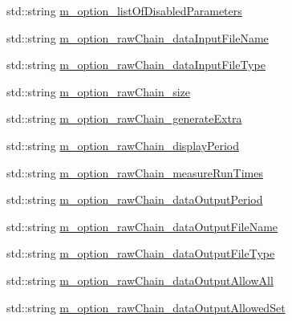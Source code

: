 \begin{DoxyCompactItemize}
\item 
std\-::string \hyperlink{class_q_u_e_s_o_1_1_metropolis_hastings_s_g_options_ae3b9e124f89c653b2b2b09d97baa87ba}{m\-\_\-option\-\_\-list\-Of\-Disabled\-Parameters}
\item 
std\-::string \hyperlink{class_q_u_e_s_o_1_1_metropolis_hastings_s_g_options_a5527cd4da92ce0da6488df811ae5a0b0}{m\-\_\-option\-\_\-raw\-Chain\-\_\-data\-Input\-File\-Name}
\item 
std\-::string \hyperlink{class_q_u_e_s_o_1_1_metropolis_hastings_s_g_options_a1e84e51f68d6be34fa1975950136a6b5}{m\-\_\-option\-\_\-raw\-Chain\-\_\-data\-Input\-File\-Type}
\item 
std\-::string \hyperlink{class_q_u_e_s_o_1_1_metropolis_hastings_s_g_options_af9f6ac21012af90a790e855ad78485e2}{m\-\_\-option\-\_\-raw\-Chain\-\_\-size}
\item 
std\-::string \hyperlink{class_q_u_e_s_o_1_1_metropolis_hastings_s_g_options_a9f4213c0fc6f0cf26eb103c78defc0ae}{m\-\_\-option\-\_\-raw\-Chain\-\_\-generate\-Extra}
\item 
std\-::string \hyperlink{class_q_u_e_s_o_1_1_metropolis_hastings_s_g_options_aa898db5d9a9541c71b727817f1fb443f}{m\-\_\-option\-\_\-raw\-Chain\-\_\-display\-Period}
\item 
std\-::string \hyperlink{class_q_u_e_s_o_1_1_metropolis_hastings_s_g_options_aa0700b39e52408944717b283e0e87607}{m\-\_\-option\-\_\-raw\-Chain\-\_\-measure\-Run\-Times}
\item 
std\-::string \hyperlink{class_q_u_e_s_o_1_1_metropolis_hastings_s_g_options_a60d3d3f6d9bebd55f80e609ceb2fc4db}{m\-\_\-option\-\_\-raw\-Chain\-\_\-data\-Output\-Period}
\item 
std\-::string \hyperlink{class_q_u_e_s_o_1_1_metropolis_hastings_s_g_options_a28d13976ef26bc450575528a37e1eeb6}{m\-\_\-option\-\_\-raw\-Chain\-\_\-data\-Output\-File\-Name}
\item 
std\-::string \hyperlink{class_q_u_e_s_o_1_1_metropolis_hastings_s_g_options_ae0bc37e9e5982b51f67e9788e4397cfa}{m\-\_\-option\-\_\-raw\-Chain\-\_\-data\-Output\-File\-Type}
\item 
std\-::string \hyperlink{class_q_u_e_s_o_1_1_metropolis_hastings_s_g_options_a336b749a8e06848243cf5bfbab2e43a6}{m\-\_\-option\-\_\-raw\-Chain\-\_\-data\-Output\-Allow\-All}
\item 
std\-::string \hyperlink{class_q_u_e_s_o_1_1_metropolis_hastings_s_g_options_a53a51bf8aa24d9dbe4a9115453bd9e2b}{m\-\_\-option\-\_\-raw\-Chain\-\_\-data\-Output\-Allowed\-Set}
\item 

\end{DoxyCompactItemize}
